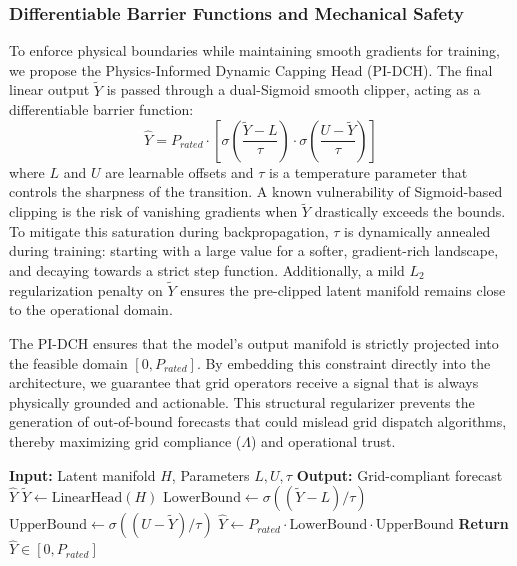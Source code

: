 \subsubsection{Differentiable Barrier Functions and Mechanical Safety}
\label{sec:barrier}
To enforce physical boundaries while maintaining smooth gradients for training, we propose the Physics-Informed Dynamic Capping Head (PI-DCH). The final linear output $\tilde{Y}$ is passed through a dual-Sigmoid smooth clipper, acting as a differentiable barrier function:
\begin{equation}
\hat{Y} = P_{rated} \cdot \left[ \sigma\left( \frac{\tilde{Y} - L}{\tau} \right) \cdot \sigma\left( \frac{U - \tilde{Y}}{\tau} \right) \right]
\end{equation}
where $L$ and $U$ are learnable offsets and $\tau$ is a temperature parameter that controls the sharpness of the transition. A known vulnerability of Sigmoid-based clipping is the risk of vanishing gradients when $\tilde{Y}$ drastically exceeds the bounds. To mitigate this saturation during backpropagation, $\tau$ is dynamically annealed during training: starting with a large value for a softer, gradient-rich landscape, and decaying towards a strict step function. Additionally, a mild $L_2$ regularization penalty on $\tilde{Y}$ ensures the pre-clipped latent manifold remains close to the operational domain.

The PI-DCH ensures that the model's output manifold is strictly projected into the feasible domain $[0, P_{rated}]$. By embedding this constraint directly into the architecture, we guarantee that grid operators receive a signal that is always physically grounded and actionable. This structural regularizer prevents the generation of out-of-bound forecasts that could mislead grid dispatch algorithms, thereby maximizing grid compliance ($\Lambda$) and operational trust.

\begin{algorithm}[H]
\caption{PI-DCH Physical Capping Logic}
\begin{algorithmic}[1]
\STATE \textbf{Input:} Latent manifold $H$, Parameters $L, U, \tau$
\STATE \textbf{Output:} Grid-compliant forecast $\hat{Y}$
\STATE $\tilde{Y} \gets \text{LinearHead}(H)$
\STATE $\text{LowerBound} \gets \sigma((\tilde{Y} - L)/\tau)$
\STATE $\text{UpperBound} \gets \sigma((U - \tilde{Y})/\tau)$
\STATE $\hat{Y} \gets P_{rated} \cdot \text{LowerBound} \cdot \text{UpperBound}$
\STATE \textbf{Return} $\hat{Y} \in [0, P_{rated}]$
\end{algorithmic}
\label{alg:pidch_capping}
\end{algorithm}
